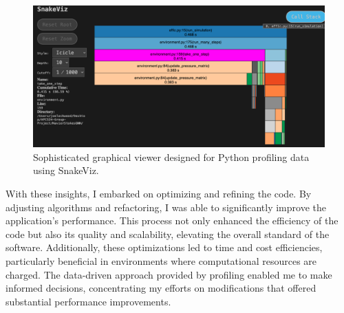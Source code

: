 \begin{figure}[h]
    \centering
    \includegraphics[width=\textwidth]{Figures/final_report/Snake_prof.png}
    \caption{Sophisticated graphical viewer designed for Python profiling data using SnakeViz.}
    \label{fig:snake}
\end{figure}

With these insights, I embarked on optimizing and refining the code. By adjusting algorithms and refactoring, I was able to significantly improve the application’s performance. This process not only enhanced the efficiency of the code but also its quality and scalability, elevating the overall standard of the software. Additionally, these optimizations led to time and cost efficiencies, particularly beneficial in environments where computational resources are charged. The data-driven approach provided by profiling enabled me to make informed decisions, concentrating my efforts on modifications that offered substantial performance improvements.